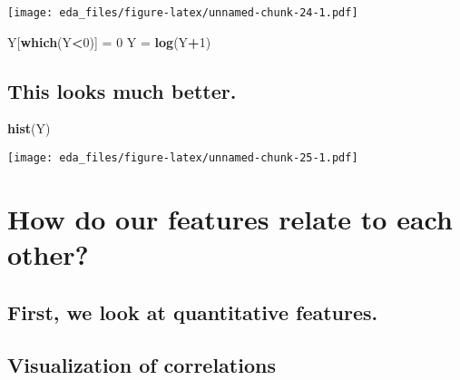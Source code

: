 \documentclass[
]{article}
\newenvironment{Shaded}{\begin{snugshade}}{\end{snugshade}}
\newcommand{\DataTypeTok}[1]{\textcolor[rgb]{0.13,0.29,0.53}{#1}}
\newcommand{\DecValTok}[1]{\textcolor[rgb]{0.00,0.00,0.81}{#1}}
\newcommand{\KeywordTok}[1]{\textcolor[rgb]{0.13,0.29,0.53}{\textbf{#1}}}
\newcommand{\NormalTok}[1]{#1}
\newcommand{\OperatorTok}[1]{\textcolor[rgb]{0.81,0.36,0.00}{\textbf{#1}}}
\newcommand{\StringTok}[1]{\textcolor[rgb]{0.31,0.60,0.02}{#1}}
\begin{document}
\texttt{[image: eda\_files/figure-latex/unnamed-chunk-24-1.pdf]}

\begin{Shaded}
\begin{Highlighting}[]
\NormalTok{Y[}\KeywordTok{which}\NormalTok{(Y}\OperatorTok{<}\DecValTok{0}\NormalTok{)] =}\StringTok{ }\DecValTok{0}
\NormalTok{Y =}\StringTok{ }\KeywordTok{log}\NormalTok{(Y}\OperatorTok{+}\DecValTok{1}\NormalTok{)}
\end{Highlighting}
\end{Shaded}

\hypertarget{this-looks-much-better.}{%
\subsection{This looks much better.}\label{this-looks-much-better.}}

\begin{Shaded}
\begin{Highlighting}[]
\KeywordTok{hist}\NormalTok{(Y)}
\end{Highlighting}
\end{Shaded}

\texttt{[image: eda\_files/figure-latex/unnamed-chunk-25-1.pdf]}

\hypertarget{how-do-our-features-relate-to-each-other}{%
\section{How do our features relate to each
other?}\label{how-do-our-features-relate-to-each-other}}

\hypertarget{first-we-look-at-quantitative-features.}{%
\subsection{First, we look at quantitative
features.}\label{first-we-look-at-quantitative-features.}}

\hypertarget{visualization-of-correlations}{%
\subsection{Visualization of
correlations}\label{visualization-of-correlations}}

\begin{Shaded}
\end{Shaded}
\end{document}
